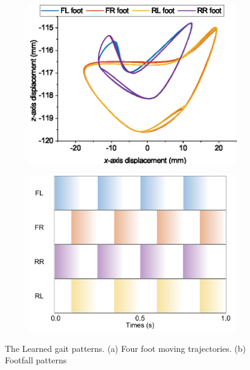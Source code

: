 \begin{figure}[htb]
    \centering
    \begin{subfigure}[b]{0.45\textwidth}
    \centering
    \includegraphics[width=\linewidth]{img/chap5/foot_trace.eps}
    \caption{}
    \end{subfigure}
    \begin{subfigure}[b]{0.45\textwidth}
    \centering
    \includegraphics[width=\linewidth]{img/chap5/pattern.pdf}
    \caption{}
    \end{subfigure}
    \caption{The Learned gait patterns. (a) Four foot moving trajectories. (b) Footfall patterns}
    \label{fig:CT_gait}
\end{figure}